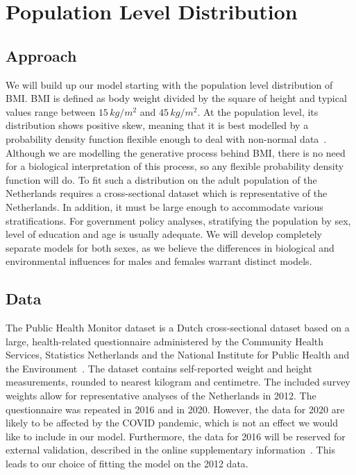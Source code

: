 \documentclass{imammb}
\numberwithin{equation}{section}
\begin{document}
\section{Population Level Distribution}
\label{sec:Population Level Distribution}

\subsection{Approach}
\label{sec:Population Level Distribution/Approach}

We will build up our model starting with the population level distribution of BMI. BMI is defined as body weight divided by the square of height and typical values range between $15 \, kg / m^2$ and $45 \, kg / m^2$. At the population level, its distribution shows positive skew, meaning that it is best modelled by a probability density function flexible enough to deal with non-normal data~\citep{Majer2013}. Although we are modelling the generative process behind BMI, there is no need for a biological interpretation of this process, so any flexible probability density function will do. To fit such a distribution on the adult population of the Netherlands requires a cross-sectional dataset which is representative of the Netherlands. In addition, it must be large enough to accommodate various stratifications. For government policy analyses, stratifying the population by sex, level of education and age is usually adequate. We will develop completely separate models for both sexes, as we believe the differences in biological and environmental influences for males and females warrant distinct models.

\subsection{Data}
\label{sec:Population Level Distribution/Data}

The Public Health Monitor dataset is a Dutch cross-sectional dataset based on a large, health-related questionnaire administered by the Community Health Services, Statistics Netherlands and the National Institute for Public Health and the Environment~\citep{GGD2012}. The dataset contains self-reported weight and height measurements, rounded to nearest kilogram and centimetre. The included survey weights allow for representative analyses of the Netherlands in 2012. The questionnaire was repeated in 2016 and in 2020. However, the data for 2020 are likely to be affected by the COVID pandemic, which is not an effect we would like to include in our model. Furthermore, the data for 2016 will be reserved for external validation, described in the online supplementary information~\citep{Bogaardt2023}. This leads to our choice of fitting the model on the 2012 data.
\end{document}
